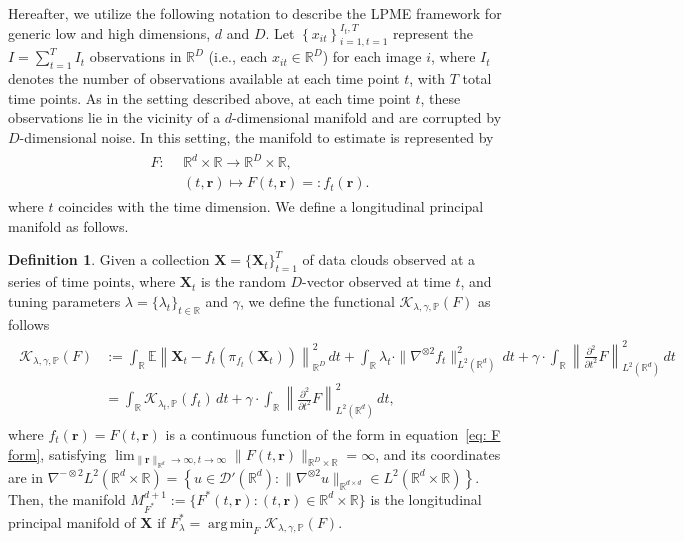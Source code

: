 \documentclass[12pt]{article}
\DeclareMathOperator*{\argmin}{arg\,min}
\theoremstyle{definition}
\newtheorem{definition}{Definition}
\begin{document}
Hereafter, we utilize the following notation to describe the LPME framework for generic low and high dimensions, $d$ and $D$. Let $\left\{x_{it}\right\}_{i=1, t=1}^{I_t, T}$ represent the $I = \sum_{t=1}^{T}I_t$ observations in $\mathbb{R}^D$ (i.e., each $x_{it}\in\mathbb{R}^D$) for each image $i$, where $I_t$ denotes the number of observations available at each time point $t$, with $T$ total time points. As in the setting described above, at each time point $t$, these observations lie in the vicinity of a $d$-dimensional manifold and are corrupted by $D$-dimensional noise. In this setting, the manifold to estimate is represented by 
\begin{align}\label{eq: F form}
    \begin{aligned}
        F:\ \ & \mathbb{R}^d\times\mathbb{R} \rightarrow \mathbb{R}^D\times\mathbb{R}, \\
    & (t,\mathbf{r})\mapsto F(t,\mathbf{r})=:f_t(\mathbf{r}).
    \end{aligned}
\end{align}
where $t$ coincides with the time dimension. We define a longitudinal principal manifold as follows.
\begin{definition}
  \label{def:lpme} Given a collection $\mathbf{X} = \{ \mathbf{X}_t \}_{t=1}^T$ of data clouds observed at a series of time points, where $\mathbf{X}_t$ is the random  $D$-vector observed at time $t$, and tuning parameters $\lambda=\{\lambda_t\}_{t\in\mathbb{R}}$ and $\gamma$, we define the functional $\mathcal{K}_{\lambda, \gamma, \mathbb{P}}(F)$ as follows
\begin{align}\label{eq:newKappa}
  \begin{aligned}
      \mathcal{K}_{\lambda, \gamma, \mathbb{P}}(F) &:= \int_\mathbb{R} \mathbb{E}\left\|\mathbf{X}_t - f_t\left(\pi_{f_t}(\mathbf{X}_t)\right)\right\|_{\mathbb{R}^{D}}^2 \, dt + \int_\mathbb{R} \lambda_t \cdot\|\nabla^{\otimes 2}f_t\|_{L^2(\mathbb{R}^{d})}^2 \, dt + \gamma\cdot \int_{\mathbb{R}}\left\|\frac{\partial^2}{\partial t^2}F\right\|_{L^2(\mathbb{R}^d)}^2 \, dt \\
  &= \int_{\mathbb{R}}\mathcal{K}_{\lambda_t, \mathbb{P}}(f_t) \, dt + \gamma \cdot \int_{\mathbb{R}}\left\|\frac{\partial^2}{\partial t^2}F\right\|_{L^2(\mathbb{R}^d)}^2 \, dt,
  \end{aligned}
\end{align}
where $f_t(\mathbf{r})=F(t,\mathbf{r})$ is a continuous function of the form in equation~\eqref{eq: F form}, satisfying $\lim_{\|\mathbf{r}\|_{\mathbb{R}^{d}} \to \infty, t \to \infty}\|F(t,\mathbf{r})\|_{\mathbb{R}^{D}\times\mathbb{R}} = \infty$, and its coordinates are in $\nabla^{-\otimes 2}L^2(\mathbb{R}^{d}\times\mathbb{R}) = \left\{u \in \mathcal{D}'(\mathbb{R}^{d}): \|\nabla^{\otimes 2} u\|_{\mathbb{R}^{d \times d}} \in L^2(\mathbb{R}^{d}\times\mathbb{R})\right\}$. Then, the manifold $M_{F^{*}}^{d+1}:=\{F^*(t,\mathbf{r}): (t,\mathbf{r})\in \mathbb{R}^d\times\mathbb{R}\}$ is the longitudinal principal manifold of $\mathbf{X}$ if $F_{\lambda}^{*} = \argmin_{F}\mathcal{K}_{\lambda, \gamma, \mathbb{P}}(F)$.
\end{definition}
\end{document}

